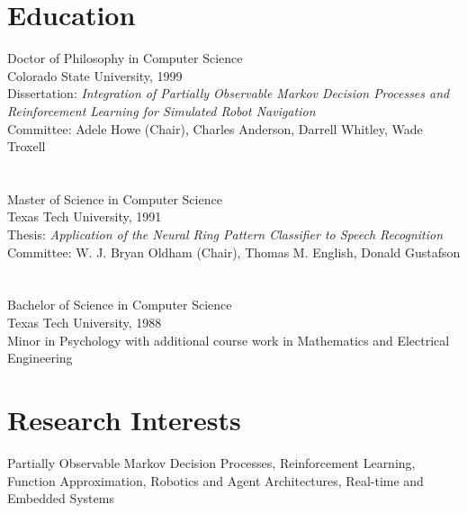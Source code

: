 \documentclass[11pt]{resume}
\begin{document}

\pagestyle{fancyplain}
\thispagestyle{empty}

\address{2624 West Dana \\ Lubbock, Texas 79415 \\ (806) 763--0577\\
         pyeatt@cs.ttu.edu }
\line


\section{Education}
  {Doctor of Philosophy in Computer Science}
  {\\Colorado State University, 1999 \\
  Dissertation:  {\it Integration of Partially Observable Markov
Decision Processes and Reinforcement Learning for Simulated Robot 
Navigation}\\ 
  Committee: Adele Howe (Chair), Charles Anderson, 
  Darrell Whitley, Wade Troxell }
   
\section{} 
  {Master of Science in Computer Science}    
  {\\Texas Tech University, 1991 \\
  Thesis:   {\it Application of the Neural Ring Pattern Classifier
  to Speech Recognition}\\
  Committee: W. J. Bryan Oldham (Chair), Thomas M. English, Donald Gustafson}
   
\section{} 
  {Bachelor of Science in Computer Science}    
  {\\Texas Tech University, 1988 \\
  Minor in Psychology with additional course work in Mathematics and 
  Electrical Engineering}

\section{Research Interests}  
  {}
  {Partially Observable Markov Decision Processes,
   Reinforcement Learning, Function Approximation, Robotics and
   Agent Architectures, Real-time and Embedded Systems }
\end{document}
